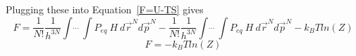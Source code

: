 \documentclass[double,12pt]{beavtex}
\begin{document}
Plugging these into Equation~\ref{F=U-TS} gives
\begin{equation} F = \frac{1}{N!}\frac{1}{h^{3N}}\int\dot~\dot~\dot~\int P_{eq}~H~d\vec r^{N} d\vec p^{N}-\frac{1}{N!}\frac{1}{h^{3N}}\int\dot~\dot~\dot~\int P_{eq}~H~d\vec r^{N} d\vec p^{N} -k_BTln(Z)\end{equation}
\begin{equation}F = -k_BTln(Z)\end{equation}




\end{document}
